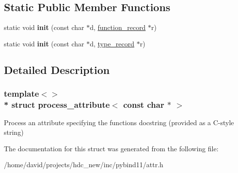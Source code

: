 \subsection*{Static Public Member Functions}
\begin{DoxyCompactItemize}
\item 
static void {\bfseries init} (const char $\ast$d, \hyperlink{structfunction__record}{function\+\_\+record} $\ast$r)\hypertarget{structprocess__attribute_3_01const_01char_01_5_01_4_aa3fbc8ac0ed21420fb92774ff884cd8c}{}\label{structprocess__attribute_3_01const_01char_01_5_01_4_aa3fbc8ac0ed21420fb92774ff884cd8c}

\item 
static void {\bfseries init} (const char $\ast$d, \hyperlink{structtype__record}{type\+\_\+record} $\ast$r)\hypertarget{structprocess__attribute_3_01const_01char_01_5_01_4_a6c0c61df22dfb8a89cf803ea8b51cbb4}{}\label{structprocess__attribute_3_01const_01char_01_5_01_4_a6c0c61df22dfb8a89cf803ea8b51cbb4}

\end{DoxyCompactItemize}


\subsection{Detailed Description}
\subsubsection*{template$<$$>$\\*
struct process\+\_\+attribute$<$ const char $\ast$ $>$}

Process an attribute specifying the function\textquotesingle{}s docstring (provided as a C-\/style string) 

The documentation for this struct was generated from the following file\+:\begin{DoxyCompactItemize}
\item 
/home/david/projects/hdc\+\_\+new/inc/pybind11/attr.\+h\end{DoxyCompactItemize}
